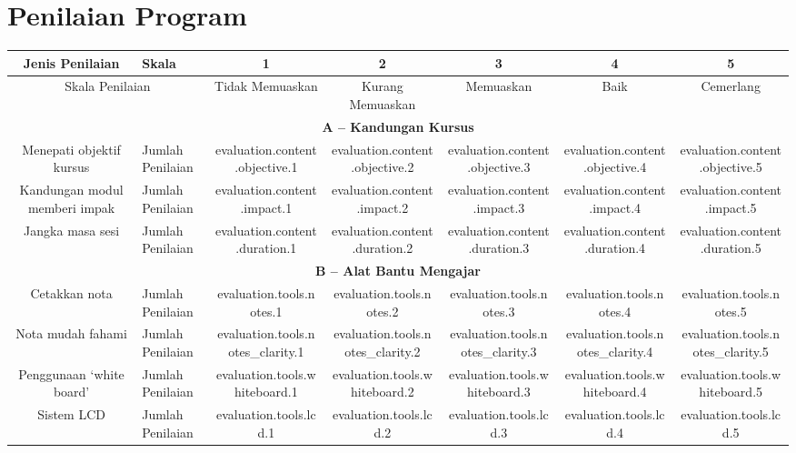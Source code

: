 \documentclass[a4paper,12pt]{article}
\begin{document}
\section{Penilaian Program}
\begin{tabular}{|c|p{6cm}|c|c|c|c|c|}
    \hline
    \rowcolor{lightgray}
    \textbf{Jenis Penilaian} & \textbf{Skala} & \textbf{1} & \textbf{2} & \textbf{3} & \textbf{4} & \textbf{5} \\
    \hline
    \multicolumn{2}{|c|}{Skala Penilaian} & Tidak Memuaskan & Kurang Memuaskan & Memuaskan & Baik & Cemerlang \\
    \hline
    \multicolumn{7}{|c|}{\textbf{A – Kandungan Kursus}} \\
    \hline
    Menepati objektif kursus & Jumlah Penilaian & {{evaluation.content.objective.1}} & {{evaluation.content.objective.2}} & {{evaluation.content.objective.3}} & {{evaluation.content.objective.4}} & {{evaluation.content.objective.5}} \\
    \hline
    Kandungan modul memberi impak & Jumlah Penilaian & {{evaluation.content.impact.1}} & {{evaluation.content.impact.2}} & {{evaluation.content.impact.3}} & {{evaluation.content.impact.4}} & {{evaluation.content.impact.5}} \\
    \hline
    Jangka masa sesi & Jumlah Penilaian & {{evaluation.content.duration.1}} & {{evaluation.content.duration.2}} & {{evaluation.content.duration.3}} & {{evaluation.content.duration.4}} & {{evaluation.content.duration.5}} \\
    \hline
    \multicolumn{7}{|c|}{\textbf{B – Alat Bantu Mengajar}} \\
    \hline
    Cetakkan nota & Jumlah Penilaian & {{evaluation.tools.notes.1}} & {{evaluation.tools.notes.2}} & {{evaluation.tools.notes.3}} & {{evaluation.tools.notes.4}} & {{evaluation.tools.notes.5}} \\
    \hline
    Nota mudah fahami & Jumlah Penilaian & {{evaluation.tools.notes_clarity.1}} & {{evaluation.tools.notes_clarity.2}} & {{evaluation.tools.notes_clarity.3}} & {{evaluation.tools.notes_clarity.4}} & {{evaluation.tools.notes_clarity.5}} \\
    \hline
    Penggunaan ‘white board’ & Jumlah Penilaian & {{evaluation.tools.whiteboard.1}} & {{evaluation.tools.whiteboard.2}} & {{evaluation.tools.whiteboard.3}} & {{evaluation.tools.whiteboard.4}} & {{evaluation.tools.whiteboard.5}} \\
    \hline
    Sistem LCD & Jumlah Penilaian & {{evaluation.tools.lcd.1}} & {{evaluation.tools.lcd.2}} & {{evaluation.tools.lcd.3}} & {{evaluation.tools.lcd.4}} & {{evaluation.tools.lcd.5}} \\

\end{tabular}
\end{document}
